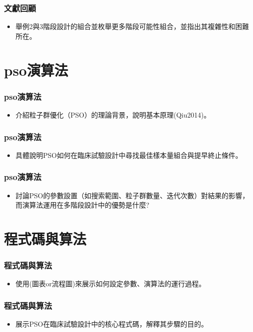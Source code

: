 \documentclass[xcolor=red]{beamer}
\begin{document}
\begin{frame}
\frametitle{文獻回顧}
\begin{itemize}
\item 舉例2與3階段設計的組合並枚舉更多階段可能性組合，並指出其複雜性和困難所在。
\end{itemize}
\end{frame}
\section{pso演算法}



\begin{frame}
\frametitle{pso演算法}
\begin{itemize}
\item 介紹粒子群優化（PSO）的理論背景，說明基本原理(Qiu2014)。
\end{itemize}
\end{frame}

\begin{frame}
\frametitle{pso演算法}
\begin{itemize}
\item 具體說明PSO如何在臨床試驗設計中尋找最佳樣本量組合與提早終止條件。
\end{itemize}
\end{frame}

\begin{frame}
\frametitle{pso演算法}
\begin{itemize}
\item 討論PSO的參數設置（如搜索範圍、粒子群數量、迭代次數）對結果的影響，而演算法運用在多階段設計中的優勢是什麼?
\end{itemize}
\end{frame}

\section{程式碼與算法}
\begin{frame}
\frametitle{程式碼與算法}
\begin{itemize}
\item 使用(圖表or流程圖)來展示如何設定參數、演算法的運行過程。
\end{itemize}
\end{frame}

\begin{frame}
\frametitle{程式碼與算法}
\begin{itemize}
\item 展示PSO在臨床試驗設計中的核心程式碼，解釋其步驟的目的。
\end{itemize}
\end{frame}
\end{document}
